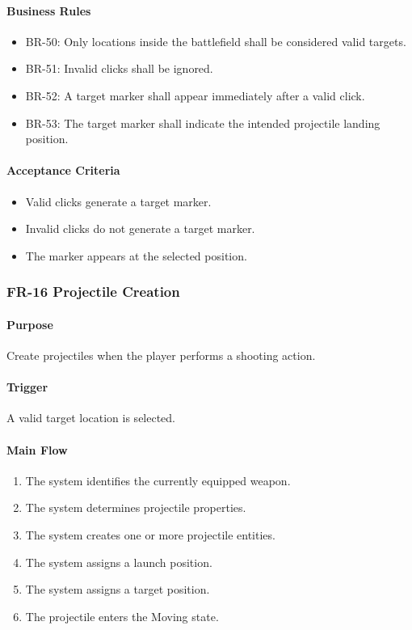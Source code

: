 \documentclass[11pt,a4paper]{article}
\begin{document}
\paragraph{Business Rules}
\begin{itemize}
  \item BR-50: Only locations inside the battlefield shall be considered valid
        targets.
  \item BR-51: Invalid clicks shall be ignored.
  \item BR-52: A target marker shall appear immediately after a valid click.
  \item BR-53: The target marker shall indicate the intended projectile landing
        position.
\end{itemize}

\paragraph{Acceptance Criteria}
\begin{itemize}
  \item Valid clicks generate a target marker.
  \item Invalid clicks do not generate a target marker.
  \item The marker appears at the selected position.
\end{itemize}

\subsubsection{FR-16 Projectile Creation}

\paragraph{Purpose}
Create projectiles when the player performs a shooting action.

\paragraph{Trigger}
A valid target location is selected.

\paragraph{Main Flow}
\begin{enumerate}
  \item The system identifies the currently equipped weapon.
  \item The system determines projectile properties.
  \item The system creates one or more projectile entities.
  \item The system assigns a launch position.
  \item The system assigns a target position.
  \item The projectile enters the Moving state.
\end{enumerate}
\end{document}
